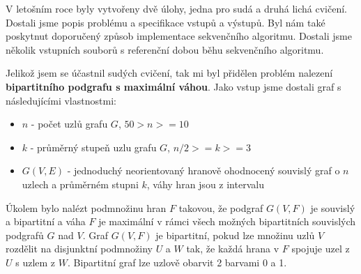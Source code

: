 V letošním roce byly vytvořeny dvě úlohy, jedna pro sudá a druhá lichá cvičení.
Dostali jsme popis problému a specifikace vstupů a výstupů.
Byl nám také poskytnut doporučený způsob implementace sekvenčního algoritmu.
Dostali jsme několik vstupních souborů s referenční dobou běhu sekvenčního algoritmu.

Jelikož jsem se účastnil sudých cvičení, tak mi byl přidělen problém nalezení \textbf{bipartitního podgrafu s maximální váhou}. Jako vstup jsme dostali graf s následujícími vlastnostmi:

\begin{itemize}
    \item \(n\) - počet uzlů grafu \(G\), \(50 > n >= 10\)
    \item \(k\) - průměrný stupeň uzlu grafu \(G\), \(n/2 >= k >= 3\)
    \item \(G(V,E)\) - jednoduchý neorientovaný hranově ohodnocený souvislý graf o \(n\) uzlech a průměrném stupni \(k\), váhy hran jsou z intervalu \(<80,120>\)
\end{itemize}

Úkolem bylo nalézt podmnožinu hran \(F\) takovou, že podgraf \(G(V,F)\) je souvislý a bipartitní a váha \(F\) je maximální v rámci všech možných bipartitních souvislých podgrafů \(G\) nad \(V\).
Graf \(G(V,F)\) je bipartitní, pokud lze množinu uzlů \(V\) rozdělit na disjunktní podmnožiny \(U\) a \(W\) tak, že každá hrana v \(F\) spojuje uzel z \(U\) s uzlem z \(W\).
Bipartitní graf lze uzlově obarvit 2 barvami 0 a 1.